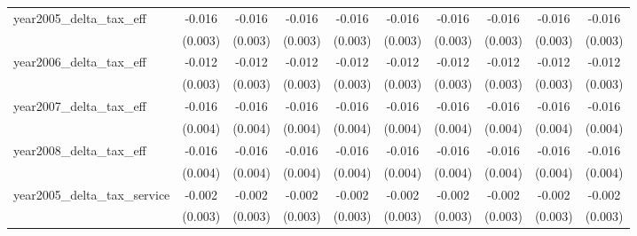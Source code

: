 {\begin{tabular}{l*{9}{c}}
year2005_delta_tax_eff&      -0.016\sym{***}&      -0.016\sym{***}&      -0.016\sym{***}&      -0.016\sym{***}&      -0.016\sym{***}&      -0.016\sym{***}&      -0.016\sym{***}&      -0.016\sym{***}&      -0.016\sym{***}\\
            &     (0.003)         &     (0.003)         &     (0.003)         &     (0.003)         &     (0.003)         &     (0.003)         &     (0.003)         &     (0.003)         &     (0.003)         \\
[1em]
year2006_delta_tax_eff&      -0.012\sym{***}&      -0.012\sym{***}&      -0.012\sym{***}&      -0.012\sym{***}&      -0.012\sym{***}&      -0.012\sym{***}&      -0.012\sym{***}&      -0.012\sym{***}&      -0.012\sym{***}\\
            &     (0.003)         &     (0.003)         &     (0.003)         &     (0.003)         &     (0.003)         &     (0.003)         &     (0.003)         &     (0.003)         &     (0.003)         \\
[1em]
year2007_delta_tax_eff&      -0.016\sym{***}&      -0.016\sym{***}&      -0.016\sym{***}&      -0.016\sym{***}&      -0.016\sym{***}&      -0.016\sym{***}&      -0.016\sym{***}&      -0.016\sym{***}&      -0.016\sym{***}\\
            &     (0.004)         &     (0.004)         &     (0.004)         &     (0.004)         &     (0.004)         &     (0.004)         &     (0.004)         &     (0.004)         &     (0.004)         \\
[1em]
year2008_delta_tax_eff&      -0.016\sym{***}&      -0.016\sym{***}&      -0.016\sym{***}&      -0.016\sym{***}&      -0.016\sym{***}&      -0.016\sym{***}&      -0.016\sym{***}&      -0.016\sym{***}&      -0.016\sym{***}\\
            &     (0.004)         &     (0.004)         &     (0.004)         &     (0.004)         &     (0.004)         &     (0.004)         &     (0.004)         &     (0.004)         &     (0.004)         \\
[1em]
year2005_delta_tax_service&      -0.002         &      -0.002         &      -0.002         &      -0.002         &      -0.002         &      -0.002         &      -0.002         &      -0.002         &      -0.002         \\
            &     (0.003)         &     (0.003)         &     (0.003)         &     (0.003)         &     (0.003)         &     (0.003)         &     (0.003)         &     (0.003)         &     (0.003)         \\

\end{tabular}}
